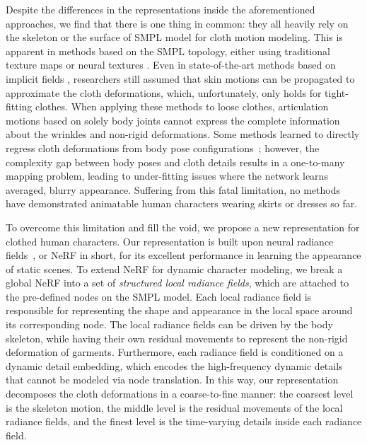Despite the differences in the representations inside the aforementioned approaches, we find that there is one thing in common: they all heavily rely on the skeleton or the surface of SMPL model for cloth motion modeling. This is apparent in methods based on the SMPL topology, either using traditional texture maps \cite{alldieck2018videoavatar,alldieck2018videoavatar_detailed,alldieck19octopus} or neural textures \cite{Liu2018Neural,liu2020NeuralHumanRendering,Shysheya2019TNR,raj2020anr}. Even in state-of-the-art methods based on implicit fields \cite{peng2021animatable_nerf,noguchi2021narf,neural_actors}, researchers still assumed that skin motions can be propagated to approximate the cloth deformations, which, unfortunately, only holds for tight-fitting clothes. 
When applying these methods to loose clothes, articulation motions based on solely body joints cannot express the complete information about the wrinkles and non-rigid deformations. Some methods learned to directly regress cloth deformations from body pose configurations~\cite{neural_actors}; however, the complexity gap between body poses and cloth details results in a one-to-many mapping problem, leading to under-fitting issues where the network learns averaged, blurry appearance. 
Suffering from this fatal limitation, no methods have demonstrated animatable human characters wearing skirts or dresses so far. 

To overcome this limitation and fill the void, we propose a new representation for clothed human characters. Our representation is built upon neural radiance fields~\cite{mildenhall2020nerf}, or NeRF in short, for its excellent performance in learning the appearance of static scenes. To extend NeRF for dynamic character modeling, we break a global NeRF into a set of \emph{structured local radiance fields}, which are attached to the pre-defined nodes on the SMPL model. Each local radiance field is responsible for representing the shape and appearance in the local space around its corresponding node. The local radiance fields can be driven by the body skeleton, while having their own residual movements to represent the non-rigid deformation of garments. Furthermore, each radiance field is conditioned on a dynamic detail embedding, which encodes the high-frequency dynamic details that cannot be modeled via node translation. In this way, our representation decomposes the cloth deformations in a coarse-to-fine manner: the coarsest level is the skeleton motion, the middle level is the residual movements of the local radiance fields, and the finest level is the time-varying details inside each radiance field. 

